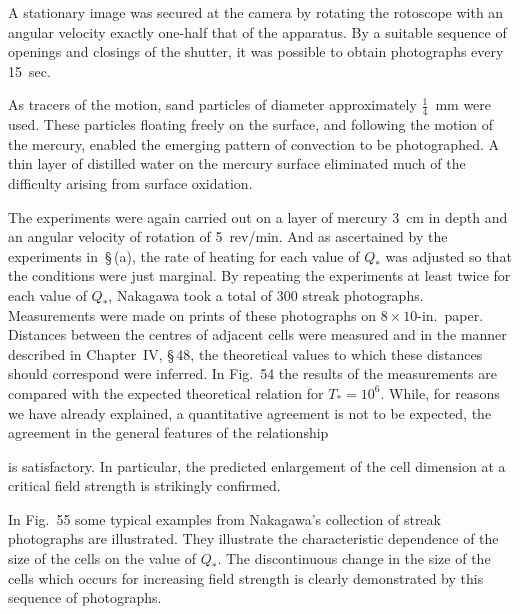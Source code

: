 A stationary image was secured at the camera by rotating the rotoscope with an angular velocity exactly one-half that of the apparatus.
By a suitable sequence of openings and closings of the shutter, it was
possible to obtain photographs every 15~sec.

As tracers of the motion, sand particles of diameter approximately
$\frac{1}{4}$~mm were used. These particles floating freely on the surface, and
following the motion of the mercury, enabled the emerging pattern of
convection to be photographed. A thin layer of distilled water on the
mercury surface eliminated much of the difficulty arising from surface
oxidation.

The experiments were again carried out on a layer of mercury 3~cm in
depth and an angular velocity of rotation of 5~rev/min. And as ascertained by the experiments in~\S\,(a), the rate of heating for each value of $Q_*$
was adjusted so that the conditions were just marginal. By repeating
the experiments at least twice for each value of $Q_*$, Nakagawa took a
total of 300 streak photographs. Measurements were made on prints of
these photographs on $8\times 10$-in.\ paper. Distances between the centres
of adjacent cells were measured and in the manner described in Chapter~IV, \S\,48, the theoretical values to which these distances should correspond were inferred. In Fig.~54 the results of the measurements are
compared with the expected theoretical relation for $T_* = 10^6$. While,
for reasons we have already explained, a quantitative agreement is not
to be expected, the agreement in the general features of the relationship


\noindent
is satisfactory. In particular, the predicted enlargement of the cell
dimension at a critical field strength is strikingly confirmed.

In Fig.~55 some typical examples from Nakagawa's collection of
streak photographs are illustrated. They illustrate the characteristic
dependence of the size of the cells on the value of $Q_*$. The discontinuous
change in the size of the cells which occurs for increasing field strength is
clearly demonstrated by this sequence of photographs.

